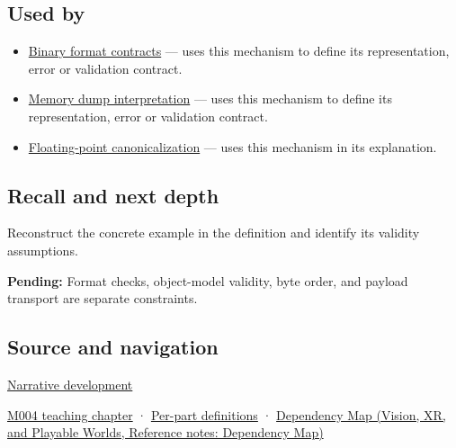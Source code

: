 \subsection{Used by}\label{appendix-34ee45f161c1-used-by}

\hypertarget{appendix-34ee45f161c1-used-by}{}

\begin{itemize}
\item
  \hyperref[appendix-590bbb2424c1]{Binary format contracts} --- uses this mechanism to define its representation, error or validation contract.
\item
  \hyperref[appendix-230b59c0676b]{Memory dump interpretation} --- uses this mechanism to define its representation, error or validation contract.
\item
  \hyperref[appendix-e90053a4b201]{Floating-point canonicalization} --- uses this mechanism in its explanation.
\end{itemize}

\subsection{Recall and next depth}\label{appendix-34ee45f161c1-recall-and-next-depth}

\hypertarget{appendix-34ee45f161c1-recall-and-next-depth}{}

Reconstruct the concrete example in the definition and identify its validity assumptions.

\textbf{Pending:} Format checks, object-model validity, byte order, and payload transport are separate constraints.

\subsection{Source and navigation}\label{appendix-34ee45f161c1-source-and-navigation}

\hypertarget{appendix-34ee45f161c1-source-and-navigation}{}

\hyperref[01-foundations-i-ch002-bytes-become-a-durable-agreement]{Narrative development}

\hyperref[01-foundations-i-ch001-a-stretching-ruler-for-real-valued-quantities]{M004 teaching chapter} · \hyperref[appendix-fd090d982a15-m004---parts-61-76]{Per-part definitions} · \href{../07-Vision-XR-and-Playable-Worlds/main.pdf\#nameddest=appendix-4ad47bdd269a}{Dependency Map (Vision, XR, and Playable Worlds, Reference notes: Dependency Map)}
